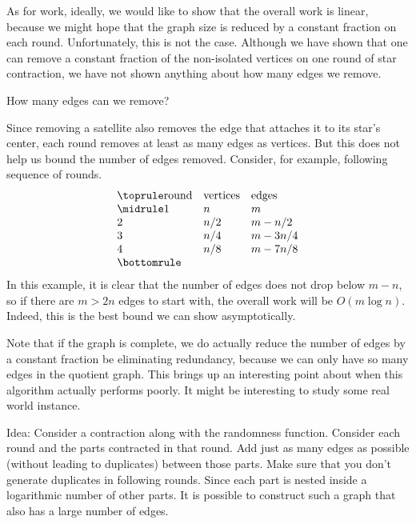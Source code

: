 {As for work, ideally, we would like to show that the overall work is
linear, because we might hope that the graph size is reduced by a constant
fraction on each round. 
%
Unfortunately, this is not the case.  Although
we have shown that one can remove a constant fraction of the
non-isolated vertices on one round of star contraction, we have not
shown anything about how many edges we remove.
%
\begin{question}
How many edges can we remove? 
\end{question}
%
Since removing a satellite also removes the edge that attaches it to
its star's center, each round  removes at least as many edges as vertices.  
%
But this does not help us bound
the number of edges removed.  Consider, for example, following sequence of
rounds.
\[
\begin{array}{lll}
\toprule
 \mbox{round} & \mbox{vertices} & \mbox{edges}\\
\midrule
 1 & n & m \\
 2 & n/2 & m - n/2 \\
 3 & n/4 & m - 3n/4 \\
 4 & n/8 & m - 7n/8 \\
\bottomrule
 \end{array}
\]
In this example, it is clear that the number of edges does not drop below $m-n$,
so if there are $m > 2n$ edges to start with, the overall work will be $O(m \log
n)$.  
%
Indeed, this is the best bound we can show asymptotically. 
%

\begin{notesonly}

Note that if the graph is complete, we do actually reduce the number
of edges by a constant fraction be eliminating redundancy, because we
can only have so many edges in the quotient graph. This brings up an
interesting point about when this algorithm actually performs poorly.
It might be interesting to study some real world instance.

\end{notesonly}



\begin{notesonly}
Idea: Consider a contraction along with the randomness function.
Consider each round and the parts contracted in that round.
Add just as many edges as possible (without leading to duplicates)
between those parts.  Make sure that you don't generate duplicates
in following rounds.  Since each part is nested inside a
logarithmic number of other parts.  It is possible to construct
such a graph that also has a large number of edges.
\end{notesonly}


}
